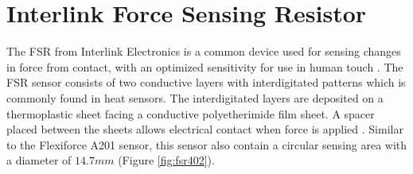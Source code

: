 \section{Interlink Force Sensing Resistor}
\label{sec:interlink}
The FSR from Interlink Electronics is a common device used for sensing changes in force from contact, with an optimized sensitivity for use in human touch \citep{interlinkelectronics}. The FSR sensor consists of two conductive layers with interdigitated patterns which is commonly found in heat sensors. The interdigitated layers are deposited on a thermoplastic sheet facing a conductive polyetherimide film sheet. A spacer placed between the sheets allows electrical contact when force is applied \citep{vecchi_experimental_2000}. Similar to the Flexiforce A201 sensor, this sensor also contain a circular sensing area with a diameter of $14.7 mm$ (Figure \ref{fig:fsr402}).

